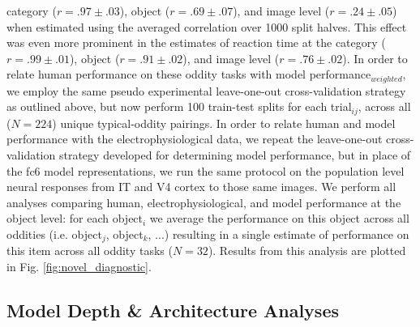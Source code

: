 \documentclass[11pt]{article}
\begin{document}
category ($r = .97 \pm .03$), object ($r = .69 \pm .07$), and image level  ($r = .24 \pm .05$) when estimated using the averaged correlation over 1000 split halves. This effect was even more prominent in the estimates of reaction time at the category  ($r = .99 \pm .01$), object  ($r = .91 \pm .02$), and image level ($r = .76 \pm .02$). In order to relate human performance on these oddity tasks with model performance$_{weighted}$, we employ the same pseudo experimental leave-one-out cross-validation strategy as outlined above, but now perform 100 train-test splits for each trial$_{ij}$, across all ($N=224$) unique typical-oddity pairings. In order to relate human and model performance with the electrophysiological data, we repeat the leave-one-out cross-validation strategy developed for determining model performance, but in place of the fc6 model representations, we run the same protocol on the population level neural responses from IT and V4 cortex to those same images. We perform all analyses comparing human, electrophysiological, and model performance at the object level: for each object$_{i}$ we average the performance on this object across all oddities (i.e. object$_{j}$, object$_{k}$, ...) resulting in a single estimate of performance on this item across all oddity tasks ($N=32$). Results from this analysis are plotted in Fig. \ref{fig:novel_diagnostic}. 

\subsection{Model Depth \& Architecture Analyses}
\end{document}
